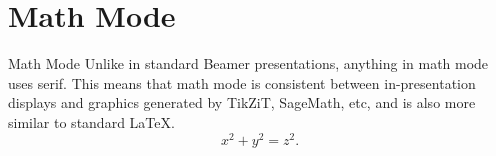\documentclass[compress]{beamer}
\begin{document}
\section{Math Mode}
\begin{frame}{Math Mode}
Unlike in standard Beamer presentations, anything in math mode uses serif. This means that math mode is consistent between in-presentation displays and graphics generated by TikZiT, SageMath, etc, and is also more similar to standard \LaTeX.
\begin{equation*}
    x^2 + y^2 = z^2.
\end{equation*}
\end{frame}
\end{document}
